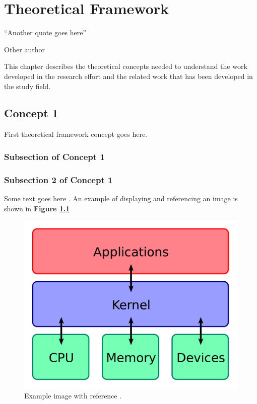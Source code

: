 \chapter{Theoretical Framework}
\label{chapter:theoretical-framework}

\epigraph{``Another quote goes here''}{\vspace{10pt}Other author}

\newpage

This chapter describes the theoretical concepts needed to understand the work developed in the research effort and the related work that has been developed in the study field.


\section{Concept 1}

\label{section:Concept1}

First theoretical framework concept goes here.

\subsection{Subsection of Concept 1} 
\subsection{Subsection 2 of Concept 1}
Some text goes here \cite{examplereference}. An example of displaying and referencing an image is shown in \textbf{Figure \ref{fig:example}}


\begin{figure}
	\begin{center}
		\includegraphics[width=1\columnwidth]{../img/image.png}
		\caption[]{Example image with reference \cite{examplereference}.}
		\label{fig:example}
	\end{center}
\end{figure}


